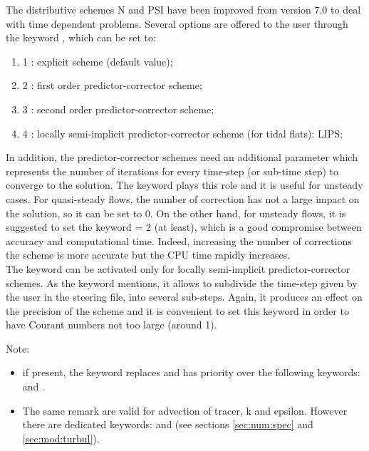 The distributive schemes N and PSI have been improved from version 7.0 to deal with time dependent problems. Several options are offered to the user through  
the keyword , which can be set to:
\begin{enumerate}
\item[\nonumber] 1 : explicit scheme (default value);
\item[\nonumber] 2 : first order predictor-corrector scheme;
\item[\nonumber] 3 : second order predictor-corrector scheme;
\item[\nonumber] 4 : locally semi-implicit predictor-corrector scheme (for tidal flats): LIPS;
\end{enumerate} 
In addition, the predictor-corrector schemes need an additional parameter which represents the number of iterations for every time-step (or sub-time step) to converge to the solution.
The keyword  plays this role and it is useful for unsteady cases. For quasi-steady flows, the number of correction has not a large impact on the solution, so it can be set to 0. On the other hand, for unsteady flows, it is suggested to set the keyword = 2 (at least), which is a good compromise between accuracy and computational time. 
Indeed, increasing the number of corrections the scheme is more accurate but the CPU time rapidly increases.\\
The keyword  can be activated only for locally semi-implicit predictor-corrector schemes. As the keyword mentions, it allows to
subdivide the time-step given by the user in the steering file, into several sub-steps. Again, it produces an effect on the precision of the scheme and it is convenient to set this keyword in order to have Courant numbers not too large (around 1).  

\begin{WarningBlock}{Note:}
\begin{itemize}

\item  if present, the keyword  replaces and has priority over the following keywords:  and .

\item  The same remark are valid for advection of tracer, k and epsilon. However there are dedicated keywords: and  (see sections \ref{sec:num:spec} and \ref{sec:mod:turbul}).
\end{itemize}
\end{WarningBlock}

